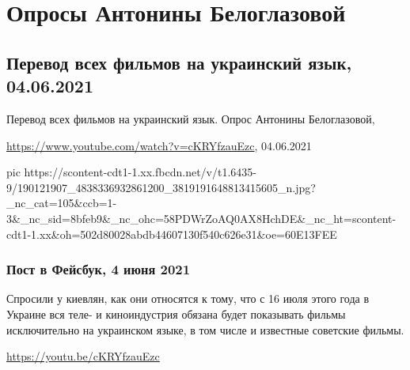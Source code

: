  
 
 
 
 
\section{Опросы Антонины Белоглазовой}

\subsection{Перевод всех фильмов на украинский язык, 04.06.2021}

Перевод всех фильмов на украинский язык. Опрос Антонины Белоглазовой,\par
\url{https://www.youtube.com/watch?v=cKRYfzauEzc}, 04.06.2021

\ifcmt
  pic https://scontent-cdt1-1.xx.fbcdn.net/v/t1.6435-9/190121907_4838336932861200_3819191648813415605_n.jpg?_nc_cat=105&ccb=1-3&_nc_sid=8bfeb9&_nc_ohc=58PDWrZoAQ0AX8HchDE&_nc_ht=scontent-cdt1-1.xx&oh=502d80028abdb44607130f540c626e31&oe=60E13FEE
\fi

\subsubsection{Пост в Фейсбук, 4 июня 2021}

Спросили у киевлян, как они относятся к тому, что с 16 июля этого года в
Украине вся теле- и киноиндустрия обязана будет показывать фильмы исключительно
на украинском языке, в том числе и известные советские фильмы.

\url{https://youtu.be/cKRYfzauEzc}


